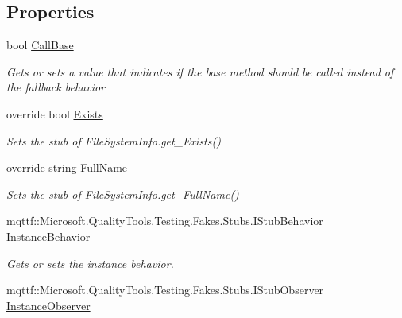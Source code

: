 \subsection*{Properties}
\begin{DoxyCompactItemize}
\item 
bool \hyperlink{class_system_1_1_i_o_1_1_fakes_1_1_stub_file_system_info_a1b5be30d19d4af8029928256a4603d3f}{Call\-Base}
\begin{DoxyCompactList}\small\item\em Gets or sets a value that indicates if the base method should be called instead of the fallback behavior\end{DoxyCompactList}\item 
override bool \hyperlink{class_system_1_1_i_o_1_1_fakes_1_1_stub_file_system_info_a13a2c85c66252fb914827f4e82abc694}{Exists}
\begin{DoxyCompactList}\small\item\em Sets the stub of File\-System\-Info.\-get\-\_\-\-Exists()\end{DoxyCompactList}\item 
override string \hyperlink{class_system_1_1_i_o_1_1_fakes_1_1_stub_file_system_info_a3224fb705831402b32ee1f094daeec5e}{Full\-Name}
\begin{DoxyCompactList}\small\item\em Sets the stub of File\-System\-Info.\-get\-\_\-\-Full\-Name()\end{DoxyCompactList}\item 
mqttf\-::\-Microsoft.\-Quality\-Tools.\-Testing.\-Fakes.\-Stubs.\-I\-Stub\-Behavior \hyperlink{class_system_1_1_i_o_1_1_fakes_1_1_stub_file_system_info_a3a65157b93d1408528aff862affe68d6}{Instance\-Behavior}
\begin{DoxyCompactList}\small\item\em Gets or sets the instance behavior.\end{DoxyCompactList}\item 
mqttf\-::\-Microsoft.\-Quality\-Tools.\-Testing.\-Fakes.\-Stubs.\-I\-Stub\-Observer \hyperlink{class_system_1_1_i_o_1_1_fakes_1_1_stub_file_system_info_a313b4afac0eb50c485d564653d3ba6cd}{Instance\-Observer}

\end{DoxyCompactItemize}
